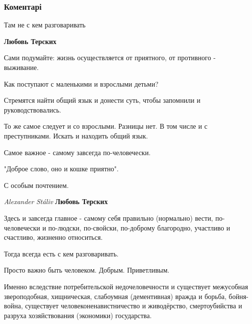  
 
 
 
 
\subsubsection{Коментарі}
\label{sec:20_10_2021.fb.fb_group.respublika_lnr.1.kiev_peregovory_sryv.cmt}

\begin{itemize} %
Там не с кем разговаривать

\begin{itemize} %
\textbf{Любовь Терских} 

Сами подумайте: жизнь осуществляется от приятного, от противного - выживание.

Как поступают с маленькими и взрослыми детьми?

Стремятся найти общий язык и донести суть, чтобы запомнили и руководствовались.

То же самое следует и со взрослыми. Разницы нет. В том числе и с преступниками.
Искать и находить общий язык.

Самое важное - самому завсегда по-человечески.

"Доброе слово, оно и кошке приятно".

С особым почтением.
\end{itemize} %

\emph{Alexander Stáliv}
\textbf{Любовь Терских} 

Здесь и завсегда главное - самому себя правильно (нормально) вести,
по-человечески и по-людски, по-свойски, по-доброму благородно, участливо и
счастливо, жизненно относиться.

Тогда всегда есть с кем разговаривать.

Просто важно быть человеком. Добрым. Приветливым.

Именно вследствие потребительской недочеловечности и существует межусобная
звероподобная, хищническая, слабоумная (дементивная) вражда и борьба,
бойня-война, существует человеконенавистничество и живодёрство, смертоубийства
и разруха хозяйствования (экономики) государства.


\end{itemize}
